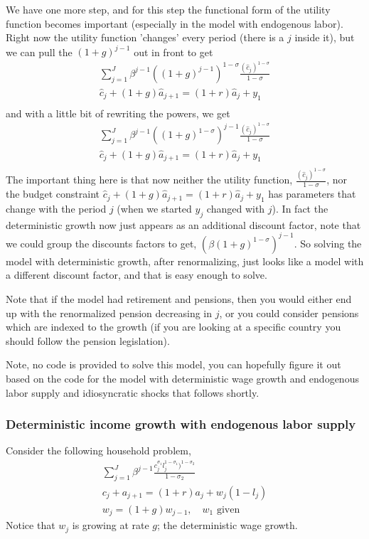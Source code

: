 We have one more step, and for this step the functional form of the utility function becomes important (especially in the model with endogenous labor). Right now the utility function 'changes' every period (there is a $j$ inside it), but we can pull the $(1+g)^{j-1}$ out in front to get
\begin{eqnarray*}
    \sum_{j=1}^J \beta^{j-1} ((1+g)^{j-1})^{1-\sigma} \frac{(\hat{c}_j )^{1-\sigma}}{1-\sigma} \\
    \hat{c}_j+(1+g)\hat{a}_{j+1}=(1+r)\hat{a}_j + y_1 \\
\end{eqnarray*}
and with a little bit of rewriting the powers, we get
\begin{eqnarray*}
    \sum_{j=1}^J \beta^{j-1} ((1+g)^{1-\sigma})^{j-1} \frac{(\hat{c}_j )^{1-\sigma}}{1-\sigma} \\
    \hat{c}_j+(1+g)\hat{a}_{j+1}=(1+r)\hat{a}_j + y_1 \\
\end{eqnarray*}
The important thing here is that now neither the utility function, $\frac{(\hat{c}_j )^{1-\sigma}}{1-\sigma}$, nor the budget constraint $\hat{c}_j+(1+g)\hat{a}_{j+1}=(1+r)\hat{a}_j + y_1$ has parameters that change with the period $j$ (when we started $y_j$ changed with $j$). In fact the deterministic growth now just appears as an additional discount factor, note that we could group the discounts factors to get, $(\beta (1+g)^{1-\sigma})^{j-1}$. So solving the model with deterministic growth, after renormalizing, just looks like a model with a different discount factor, and that is easy enough to solve.

Note that if the model had retirement and pensions, then you would either end up with the renormalized pension decreasing in $j$, or you could consider pensions which are indexed to the growth (if you are looking at a specific country you should follow the pension legislation).

Note, no code is provided to solve this model, you can hopefully figure it out based on the code for the model with deterministic wage growth and endogenous labor supply and idiosyncratic shocks that follows shortly.

\subsubsection{Deterministic income growth with endogenous labor supply}
Consider the following household problem,
\begin{eqnarray*}
    \sum_{j=1}^J \beta^{j-1} \frac{c_j^{\sigma_1} l_j^{1-\sigma_1})^{1-\sigma_2}}{1-\sigma_2} \\
    c_j+a_{j+1}=(1+r)a_j + w_j (1-l_j) \\
    w_j=(1+g)w_{j-1}, \quad w_1\text{ given}
\end{eqnarray*}
Notice that $w_j$ is growing at rate $g$; the deterministic wage growth.

